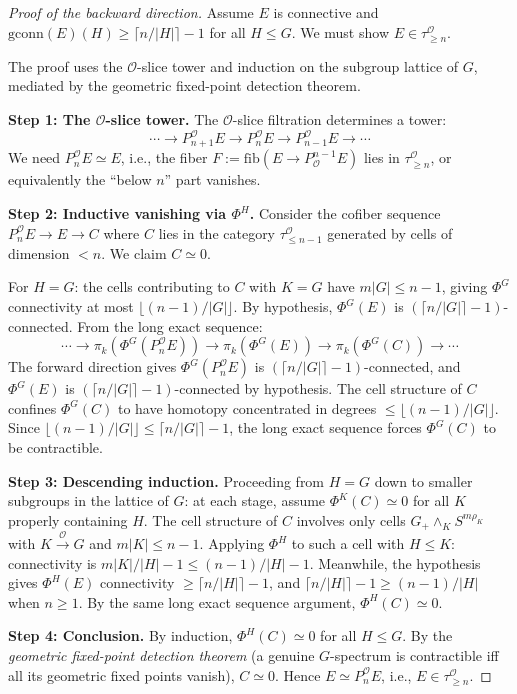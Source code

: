 \begin{proof}[Proof of the backward direction]
Assume $E$ is connective and
$\mathrm{gconn}(E)(H) \geq \lceil n/|H| \rceil - 1$ for all $H \leq G$.
We must show $E \in \tau_{\geq n}^{\mathcal{O}}$.

The proof uses the $\mathcal{O}$-slice tower and induction on the
subgroup lattice of $G$, mediated by the geometric fixed-point
detection theorem.

\textbf{Step 1: The $\mathcal{O}$-slice tower.}
The $\mathcal{O}$-slice filtration determines a tower:
\[
  \cdots \to P_{n+1}^{\mathcal{O}} E \to P_n^{\mathcal{O}} E
  \to P_{n-1}^{\mathcal{O}} E \to \cdots
\]
We need $P_n^{\mathcal{O}} E \simeq E$, i.e., the fiber
$F := \mathrm{fib}(E \to P^{n-1}_{\mathcal{O}} E)$ lies in
$\tau_{\geq n}^{\mathcal{O}}$, or equivalently the ``below $n$'' part
vanishes.

\textbf{Step 2: Inductive vanishing via $\Phi^H$.}
Consider the cofiber sequence $P_n^{\mathcal{O}} E \to E \to C$ where
$C$ lies in the category $\tau_{\leq n-1}^{\mathcal{O}}$ generated by
cells of dimension $< n$. We claim $C \simeq 0$.

For $H = G$: the cells contributing to $C$ with $K = G$ have
$m|G| \leq n-1$, giving $\Phi^G$ connectivity at most
$\lfloor (n-1)/|G| \rfloor$. By hypothesis, $\Phi^G(E)$ is
$(\lceil n/|G| \rceil - 1)$-connected. From the long exact sequence:
\[
  \cdots \to \pi_k(\Phi^G(P_n^{\mathcal{O}} E)) \to
  \pi_k(\Phi^G(E)) \to \pi_k(\Phi^G(C)) \to \cdots
\]
The forward direction gives $\Phi^G(P_n^{\mathcal{O}} E)$ is
$(\lceil n/|G| \rceil - 1)$-connected, and $\Phi^G(E)$ is
$(\lceil n/|G| \rceil - 1)$-connected by hypothesis. The cell structure
of $C$ confines $\Phi^G(C)$ to have homotopy concentrated in degrees
$\leq \lfloor (n-1)/|G| \rfloor$. Since
$\lfloor (n-1)/|G| \rfloor \leq \lceil n/|G| \rceil - 1$, the long exact
sequence forces $\Phi^G(C)$ to be contractible.

\textbf{Step 3: Descending induction.}
Proceeding from $H = G$ down to smaller subgroups in the lattice of $G$:
at each stage, assume $\Phi^K(C) \simeq 0$ for all $K$ properly containing
$H$. The cell structure of $C$ involves only cells $G_+ \wedge_K S^{m\rho_K}$
with $K \xrightarrow{\mathcal{O}} G$ and $m|K| \leq n-1$. Applying $\Phi^H$
to such a cell with $H \leq K$: connectivity is $m|K|/|H| - 1 \leq (n-1)/|H| - 1$.
Meanwhile, the hypothesis gives $\Phi^H(E)$ connectivity
$\geq \lceil n/|H| \rceil - 1$, and
$\lceil n/|H| \rceil - 1 \geq (n-1)/|H|$ when $n \geq 1$.
By the same long exact sequence argument, $\Phi^H(C) \simeq 0$.

\textbf{Step 4: Conclusion.}
By induction, $\Phi^H(C) \simeq 0$ for all $H \leq G$. By the
\emph{geometric fixed-point detection theorem} \cite{GM, HHR}
(a genuine $G$-spectrum is contractible iff all its geometric fixed
points vanish), $C \simeq 0$. Hence $E \simeq P_n^{\mathcal{O}} E$,
i.e., $E \in \tau_{\geq n}^{\mathcal{O}}$.
\end{proof}


